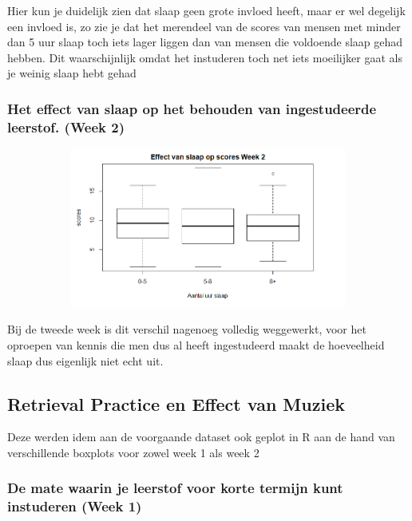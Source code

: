 \documentclass{hogent-article}
\begin{document}
Hier kun je duidelijk zien dat slaap geen grote invloed heeft, maar er wel degelijk een invloed is, zo zie je dat het merendeel van de scores van mensen met minder dan 5 uur slaap toch iets lager liggen dan van mensen die voldoende slaap gehad hebben. Dit waarschijnlijk omdat het instuderen toch net iets moeilijker gaat als je weinig slaap hebt gehad

\subsubsection{Het effect van slaap op het behouden van ingestudeerde leerstof. (Week 2)}

\begin{figure}[H]
	\begin{subfigure}{0.45\textwidth}
		\includegraphics[width=\linewidth]{slaapGraph2}
	\end{subfigure}
\end{figure}

Bij de tweede week is dit verschil nagenoeg volledig weggewerkt, voor het oproepen van kennis die men dus al heeft ingestudeerd maakt de hoeveelheid slaap dus eigenlijk niet echt uit.

\subsection{Retrieval Practice en Effect van Muziek}

Deze werden idem aan de voorgaande dataset ook geplot in R aan de hand van verschillende boxplots voor zowel week 1 als week 2

\subsubsection{De mate waarin je leerstof voor korte termijn kunt instuderen (Week 1)}
\end{document}
